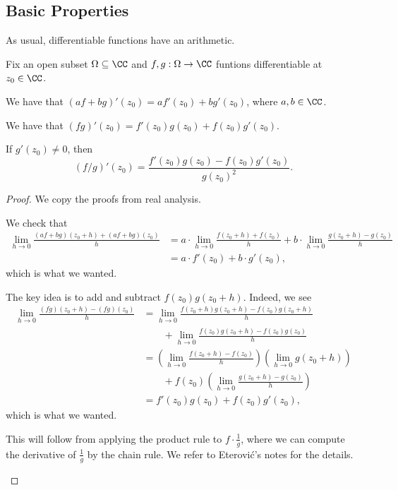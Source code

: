 \subsection{Basic Properties}
As usual, differentiable functions have an arithmetic.
\begin{proposition}
	Fix an open subset $\Omega\subseteq\CC$ and $f,g:\Omega\to\CC$ funtions differentiable at $z_0\in\CC$.
	\begin{listalph}
		\item We have that $(af+bg)'(z_0)=af'(z_0)+bg'(z_0)$, where $a,b\in\CC$.
		\item We have that $(fg)'(z_0)=f'(z_0)g(z_0)+f(z_0)g'(z_0)$.
		\item If $g'(z_0)\ne0$, then
		\[(f/g)'(z_0)=\frac{f'(z_0)g(z_0)-f(z_0)g'(z_0)}{g(z_0)^2}.\]
	\end{listalph}
\end{proposition}
\begin{proof}
	We copy the proofs from real analysis.
	\begin{listalph}
		\item We check that
		\begin{align*}
			\lim_{h\to0}\frac{(af+bg)(z_0+h)+(af+bg)(z_0)}h &= a\cdot\lim_{h\to0}\frac{f(z_0+h)+f(z_0)}h+b\cdot\lim_{h\to0}\frac{g(z_0+h)-g(z_0)}h \\
			&= a\cdot f'(z_0)+b\cdot g'(z_0),
		\end{align*}
		which is what we wanted.
		\item The key idea is to add and subtract $f(z_0)g(z_0+h)$. Indeed, we see
		\begin{align*}
			\lim_{h\to0}\frac{(fg)(z_0+h)-(fg)(z_0)}{h} &= \lim_{h\to0}\frac{f(z_0+h)g(z_0+h)-f(z_0)g(z_0+h)}{h} \\
			&\qquad+\lim_{h\to0}\frac{f(z_0)g(z_0+h)-f(z_0)g(z_0)}h \\
			&= \left(\lim_{h\to0}\frac{f(z_0+h)-f(z_0)}{h}\right)\left(\lim_{h\to0}g(z_0+h)\right) \\
			&\qquad+f(z_0)\left(\lim_{h\to0}\frac{g(z_0+h)-g(z_0)}h\right) \\
			&= f'(z_0)g(z_0)+f(z_0)g'(z_0),
		\end{align*}
		which is what we wanted.
		\item This will follow from applying the product rule to $f\cdot\frac1g$, where we can compute the derivative of $\frac1g$ by the chain rule. We refer to Eterovi\'c's notes for the details.
		\qedhere
	\end{listalph}
\end{proof}
